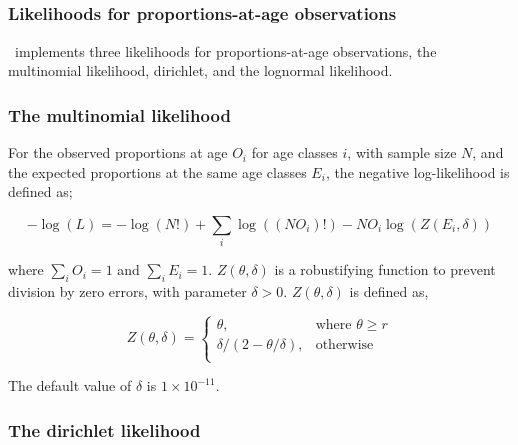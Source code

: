 {{{{\begin{itemize}
\end{itemize}

\subsection{\label{sec:likelihood-observations}}

\subsubsection{Likelihoods for proportions-at-age observations}
\CNAME\ implements three likelihoods for proportions-at-age observations, the multinomial likelihood, dirichlet, and the lognormal likelihood. 

\subsubsection*{The multinomial likelihood}
For the observed proportions at age $O_i$ for age classes $i$, with sample size $N$, and the expected proportions at the same age classes $E_i$, the negative log-likelihood is defined as; 

\begin{equation}
-\log \left(L \right) =  -\log \left(N! \right) + \sum\limits_i \log \left( \left(NO_i \right)! \right) - NO_i \log \left(Z \left(E_i,\delta \right) \right)
\end{equation}

where $\sum\limits_i O_i = 1$ and $\sum\limits_i E_i = 1$. $Z \left(\theta,\delta \right)$ is a robustifying function to prevent division by zero errors, with parameter $\delta>0$. $Z \left(\theta,\delta \right)$ is defined as,

\begin{equation}
Z \left(\theta,\delta \right) = \begin{cases}
\theta, & \text{where $\theta \ge r$} \\
\delta/\left( 2-\theta/\delta \right), & \text{otherwise} \\  
\end{cases}
\end{equation}

The default value of $\delta$ is $1 \times 10^{-11}$.
\subsubsection*{The dirichlet likelihood}

}}}}
